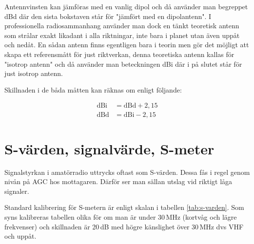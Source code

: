 Antennvinsten kan jämföras med en vanlig dipol och då använder man begreppet
dBd där den sista bokstaven står för "jämfört med en dipolantenn". I
professionella radiosammanhang använder man dock en tänkt teoretisk antenn som
strålar exakt likadant i alla riktningar, inte bara i planet utan även uppåt
och nedåt. En sådan antenn finns egentligen bara i teorin men gör det möjligt
att skapa ett referensmått för just riktverkan, denna teoretiska antenn kallas
för "isotrop antenn" och då använder man beteckningen dBi där i på slutet står
för just isotrop antenn.

Skillnaden i de båda måtten kan räknas om enligt följande:

\begin{align}
\text{dBi} &= \text{dBd} + 2,15\\
\text{dBd} &= \text{dBi} - 2,15
\end{align}

\section{S-värden, signalvärde, S-meter}

Signalstyrkan i amatörradio uttrycks oftast som S-värden. Dessa fås i regel
genom nivån på AGC hos mottagaren. Därför ser man sällan utslag vid riktigt
låga signaler.

Standard kalibrering för S-metern är enligt skalan i tabellen
\ref{tab:s-varden}. Som syns kalibreras tabellen olika för om man är under
30\,MHz (kortvåg och lägre frekvenser) och skillnaden är 20\,dB med högre
känslighet över 30\,MHz dvs VHF och uppåt.


